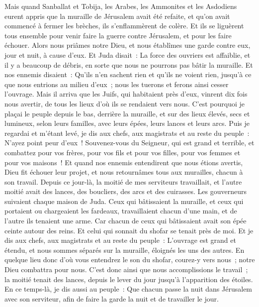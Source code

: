 \begin{multicols}{2}
Mais quand Sanballat et Tobija, les Arabes, les Ammonites et les Asdodiens eurent appris que la muraille de Jérusalem avait été refaite, et qu'on avait commencé à fermer les brèches, ils s'enflammèrent de colère.
Et ils se liguèrent tous ensemble pour venir faire la guerre contre Jérusalem, et pour les faire échouer.
Alors nous priâmes notre Dieu, et nous établîmes une garde contre eux, jour et nuit, à cause d'eux.
Et Juda disait~: La force des ouvriers est affaiblie, et il y a beaucoup de débris, en sorte que nous ne pourrons pas bâtir la muraille.
Et nos ennemis disaient~: Qu'ils n'en sachent rien et qu'ils ne voient rien, jusqu'à ce que nous entrions au milieu d'eux~; nous les tuerons et ferons ainsi cesser l'ouvrage.
Mais il arriva que les Juifs, qui habitaient près d'eux, vinrent dix fois nous avertir, de tous les lieux d'où ils se rendaient vers nous.
C'est pourquoi je plaçai le peuple depuis le bas, derrière la muraille, et sur des lieux élevés, secs et lumineux, selon leurs familles, avec leurs épées, leurs lances et leurs arcs.
Puis je regardai et m'étant levé, je dis aux chefs, aux magistrats et au reste du peuple~: N'ayez point peur d'eux~! Souvenez-vous du Seigneur, qui est grand et terrible, et combattez pour vos frères, pour vos fils et pour vos filles, pour vos femmes et pour vos maisons~!
Et quand nos ennemis entendirent que nous étions avertis, Dieu fit échouer leur projet, et nous retournâmes tous aux murailles, chacun à son travail.
Depuis ce jour-là, la moitié de mes serviteurs travaillait, et l'autre moitié avait des lances, des boucliers, des arcs et des cuirasses. Les gouverneurs suivaient chaque maison de Juda.
Ceux qui bâtissaient la muraille, et ceux qui portaient ou chargeaient les fardeaux, travaillaient chacun d'une main, et de l'autre ils tenaient une arme.
Car chacun de ceux qui bâtissaient avait son épée ceinte autour des reins. Et celui qui sonnait du shofar se tenait près de moi.
Et je dis aux chefs, aux magistrats et au reste du peuple~: L'ouvrage est grand et étendu, et nous sommes séparés sur la muraille, éloignés les uns des autres.
En quelque lieu donc d'où vous entendrez le son du shofar, courez-y vers nous~; notre Dieu combattra pour nous.
C'est donc ainsi que nous accomplissions le travail~; la moitié tenait des lances, depuis le lever du jour jusqu'à l'apparition des étoiles.
En ce temps-là, je dis aussi au peuple~: Que chacun passe la nuit dans Jérusalem avec son serviteur, afin de faire la garde la nuit et de travailler le jour.

\end{multicols}
